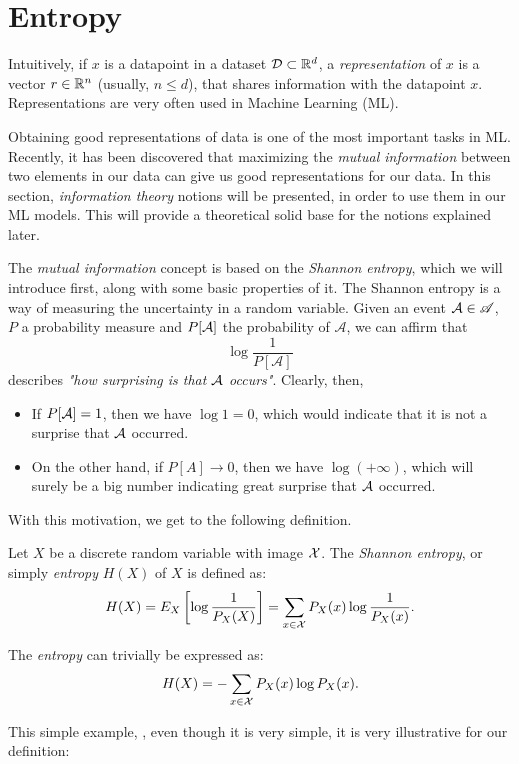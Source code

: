 \section{Entropy}
Intuitively, if $x$ is a datapoint in a dataset $\mathcal{D} \subset \mathbb{R}^d$, a \emph{representation} of $x$ is a vector $r \in \mathbb{R}^n$ (usually, $n \leq d$), that shares information with the datapoint $x$. Representations are very often used in Machine Learning (ML).

Obtaining good representations of data is one of the most important tasks in ML. 
Recently, it has been discovered that maximizing the \emph{mutual information} between two elements in our data can give us good representations for our data.
In this section, \emph{information theory} notions will be presented, in order to use them in our ML models. This will provide a theoretical solid base for
the notions explained later.


The \emph{mutual information} concept is based on the \emph{Shannon entropy}, which we will introduce first, along with some basic properties of it. The Shannon entropy is a way of measuring the uncertainty in a random variable. 
Given an event $\mathcal A \in \mathscr{A}$, $P$ a probability measure and $P[\mathcal A]$ the probability of $\mathcal A$, we can affirm that 
$$
\log\frac{1}{P[\mathcal A]}
$$
describes \emph{"how surprising is that $\mathcal A$ occurs"}. Clearly, then, 
\begin{itemize}
\item If $P[\mathcal A]= 1$, then we have $\log 1 = 0$, which would indicate that it is not a surprise that $\mathcal A$ occurred.

\item On the other hand, if $P[A]\to 0$, then we have $\log(+\infty)$, which will surely be a big number indicating great surprise that $\mathcal A$ occurred.
\end{itemize}

With this motivation, we get to the following definition.
\begin{ndef}
Let $X$ be a discrete random variable with image $\mathcal{X}$. The \emph{Shannon entropy}, or simply \emph{entropy}  $H(X)$ of $X$ is defined as:
$$
H(X) = E_X\left[\log\frac{1}{P_X(X)}\right] =  \sum_{x \in \mathcal{X}} P_X(x) \log\frac{1}{P_X(x)}.
$$
\end{ndef}
The \emph{entropy} can trivially be expressed as:
$$
H(X) = - \sum_{x \in \mathcal{X}}P_X (x)\log P_X(x).
$$

This simple example, \citep{cover_elements_1991}, even though it is very simple, it is very illustrative for our definition:

